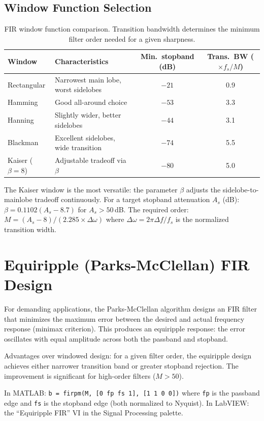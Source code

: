 \documentclass[11pt,letterpaper,twoside,openany]{book}
\begin{document}
\subsection{Window Function Selection}
\begin{table}[htbp]\centering\small
\begin{tabularx}{\textwidth}{l X c c}
\toprule
\textbf{Window} & \textbf{Characteristics} & \textbf{Min.\ stopband (dB)} & \textbf{Trans.\ BW ($\times f_s/M$)} \\
\midrule
Rectangular & Narrowest main lobe, worst sidelobes & $-21$ & 0.9 \\
Hamming & Good all-around choice & $-53$ & 3.3 \\
Hanning & Slightly wider, better sidelobes & $-44$ & 3.1 \\
Blackman & Excellent sidelobes, wide transition & $-74$ & 5.5 \\
Kaiser ($\beta = 8$) & Adjustable tradeoff via $\beta$ & $-80$ & 5.0 \\
\bottomrule
\end{tabularx}
\caption{FIR window function comparison. Transition bandwidth determines the minimum filter order needed for a given sharpness.}
\end{table}

The Kaiser window is the most versatile: the parameter $\beta$ adjusts the sidelobe-to-mainlobe tradeoff continuously. For a target stopband attenuation $A_s$ (dB): $\beta = 0.1102(A_s - 8.7)$ for $A_s > 50$\,dB. The required order: $M = (A_s - 8)/(2.285 \times \Delta\omega)$ where $\Delta\omega = 2\pi\Delta f/f_s$ is the normalized transition width.

\section{Equiripple (Parks-McClellan) FIR Design}
For demanding applications, the Parks-McClellan algorithm designs an FIR filter that minimizes the maximum error between the desired and actual frequency response (minimax criterion). This produces an equiripple response: the error oscillates with equal amplitude across both the passband and stopband.

Advantages over windowed design: for a given filter order, the equiripple design achieves either narrower transition band or greater stopband rejection. The improvement is significant for high-order filters ($M > 50$).

In MATLAB: \texttt{b = firpm(M, [0 fp fs 1], [1 1 0 0])} where \texttt{fp} is the passband edge and \texttt{fs} is the stopband edge (both normalized to Nyquist). In LabVIEW: the ``Equiripple FIR'' VI in the Signal Processing palette.
\end{document}
